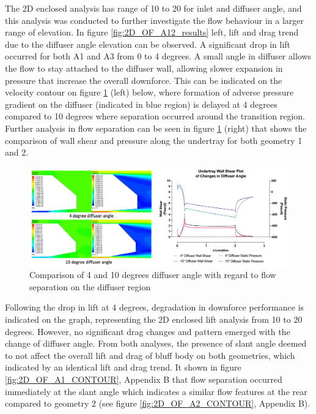 \noindent The 2D enclosed analysis has range of 10 to 20 for inlet and diffuser angle, and this analysis was conducted to further investigate the flow behaviour in a larger range of elevation. In figure \ref{fig:2D_OF_A12_results} left, lift and drag trend due to the diffuser angle elevation can be observed. A significant drop in lift occurred for both A1 and A3 from 0 to 4 degrees. A small angle in diffuser allows the flow to stay attached to the diffuser wall, allowing slower expansion in pressure that increase the overall downforce. This can be indicated on the velocity contour on figure \ref{fig:2D_OF_10_4_Contour_compare} (left) below, where formation of adverse pressure gradient on the diffuser  (indicated in blue region) is delayed at 4 degrees compared to 10 degrees where separation occurred around the transition region. Further analysis in flow separation can be seen in figure \ref{fig:2D_OF_10_4_Contour_compare} (right)  that shows the comparison of wall shear and pressure along the undertray for both geometry 1 and 2. 


\begin{figure}[!htb]
    \centering
    \includegraphics[scale=0.55]{Figures/2D_OF/10_4_O_COMPARE CONTOUR.PNG}
    \caption{Comparison of 4 and 10 degrees diffuser angle with regard to flow separation on the diffuser region }
    \label{fig:2D_OF_10_4_Contour_compare}
\end{figure}

\noindent Following the drop in lift at 4 degrees, degradation in downforce performance is indicated on the graph, representing the 2D enclosed lift analysis from 10 to 20 degrees. However, no significant drag changes and pattern emerged with the change of diffuser angle. From both analyses, the presence of slant angle deemed to not affect the overall lift and drag of bluff body on both geometries, which indicated by an identical lift and drag trend. It shown in figure \ref{fig:2D_OF_A1_CONTOUR}, Appendix B that flow separation occurred immediately at the slant angle which indicates a similar flow features at the rear compared to geometry 2 (see figure \ref{fig:2D_OF_A2_CONTOUR}, Appendix B). 


